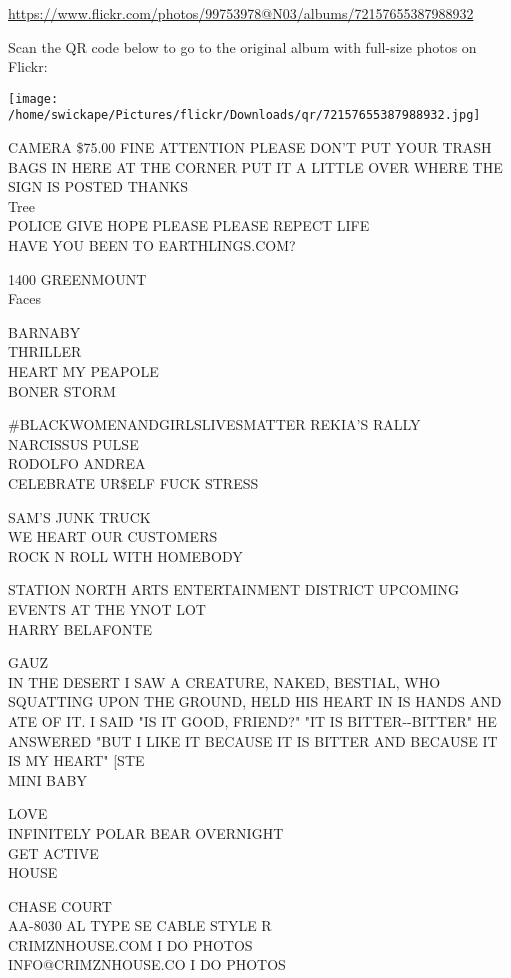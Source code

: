 \documentclass[10pt,letterpaper]{article}
\begin{document}
\url{https://www.flickr.com/photos/99753978@N03/albums/72157655387988932}

Scan the QR code below to go to the original album with full-size photos on Flickr:

\texttt{[image: /home/swickape/Pictures/flickr/Downloads/qr/72157655387988932.jpg]}
\pagebreak

CAMERA \$75.00 FINE ATTENTION PLEASE DON'T PUT YOUR TRASH BAGS IN HERE AT THE CORNER PUT IT A LITTLE OVER WHERE THE SIGN IS POSTED THANKS\\
Tree\\
POLICE GIVE HOPE PLEASE PLEASE REPECT LIFE\\
HAVE YOU BEEN TO EARTHLINGS.COM?

1400 GREENMOUNT\\
Faces

BARNABY\\
THRILLER\\
HEART MY PEAPOLE\\
BONER STORM

\#BLACKWOMENANDGIRLSLIVESMATTER REKIA'S RALLY\\
NARCISSUS PULSE\\
RODOLFO ANDREA\\
CELEBRATE UR\$ELF FUCK STRESS

SAM'S JUNK TRUCK\\
WE HEART OUR CUSTOMERS\\
ROCK N ROLL WITH HOMEBODY

STATION NORTH ARTS ENTERTAINMENT DISTRICT UPCOMING EVENTS AT THE YNOT LOT\\
HARRY BELAFONTE

GAUZ\\
IN THE DESERT I SAW A CREATURE, NAKED, BESTIAL, WHO SQUATTING UPON THE GROUND, HELD HIS HEART IN IS HANDS AND ATE OF IT.  I SAID "IS IT GOOD, FRIEND?"  "IT IS BITTER{-}{-}BITTER" HE ANSWERED "BUT I LIKE IT BECAUSE IT IS BITTER AND BECAUSE IT IS MY HEART" {[}STE\\
MINI BABY

LOVE\\
INFINITELY POLAR BEAR OVERNIGHT\\
GET ACTIVE\\
HOUSE

CHASE COURT\\
AA{-}8030 AL TYPE SE CABLE STYLE R\\
CRIMZNHOUSE.COM I DO PHOTOS\\
INFO@CRIMZNHOUSE.CO I DO PHOTOS
\end{document}

